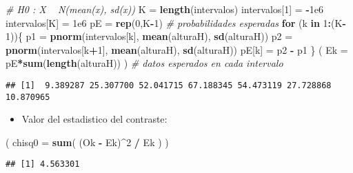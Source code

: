 \documentclass[]{article}
\newenvironment{Shaded}{\begin{snugshade}}{\end{snugshade}}
\newcommand{\KeywordTok}[1]{\textcolor[rgb]{0.13,0.29,0.53}{\textbf{#1}}}
\newcommand{\DataTypeTok}[1]{\textcolor[rgb]{0.13,0.29,0.53}{#1}}
\newcommand{\DecValTok}[1]{\textcolor[rgb]{0.00,0.00,0.81}{#1}}
\newcommand{\FloatTok}[1]{\textcolor[rgb]{0.00,0.00,0.81}{#1}}
\newcommand{\StringTok}[1]{\textcolor[rgb]{0.31,0.60,0.02}{#1}}
\newcommand{\CommentTok}[1]{\textcolor[rgb]{0.56,0.35,0.01}{\textit{#1}}}
\newcommand{\ControlFlowTok}[1]{\textcolor[rgb]{0.13,0.29,0.53}{\textbf{#1}}}
\newcommand{\OperatorTok}[1]{\textcolor[rgb]{0.81,0.36,0.00}{\textbf{#1}}}
\newcommand{\NormalTok}[1]{#1}
\providecommand{\tightlist}{%
  \setlength{\itemsep}{0pt}\setlength{\parskip}{0pt}}
\begin{document}
\begin{Shaded}
\begin{Highlighting}[]
\CommentTok{# H0 : X ~ N(mean(x), sd(x))}
\NormalTok{K =}\StringTok{ }\KeywordTok{length}\NormalTok{(intervalos)}
\NormalTok{intervalos[}\DecValTok{1}\NormalTok{] =}\StringTok{ }\OperatorTok{-}\FloatTok{1e6}
\NormalTok{intervalos[K] =}\StringTok{ }\FloatTok{1e6}
\NormalTok{pE =}\StringTok{ }\KeywordTok{rep}\NormalTok{(}\DecValTok{0}\NormalTok{,K}\OperatorTok{-}\DecValTok{1}\NormalTok{) }\CommentTok{# probabilidades esperadas}
\ControlFlowTok{for}\NormalTok{ (k }\ControlFlowTok{in} \DecValTok{1}\OperatorTok{:}\NormalTok{(K}\OperatorTok{-}\DecValTok{1}\NormalTok{))\{}
\NormalTok{  p1 =}\StringTok{ }\KeywordTok{pnorm}\NormalTok{(intervalos[k], }\KeywordTok{mean}\NormalTok{(alturaH), }\KeywordTok{sd}\NormalTok{(alturaH))}
\NormalTok{  p2 =}\StringTok{ }\KeywordTok{pnorm}\NormalTok{(intervalos[k}\OperatorTok{+}\DecValTok{1}\NormalTok{], }\KeywordTok{mean}\NormalTok{(alturaH), }\KeywordTok{sd}\NormalTok{(alturaH))}
\NormalTok{  pE[k] =}\StringTok{ }\NormalTok{p2 }\OperatorTok{-}\StringTok{ }\NormalTok{p1}
\NormalTok{\}}
\NormalTok{( }\DataTypeTok{Ek =}\NormalTok{ pE}\OperatorTok{*}\KeywordTok{sum}\NormalTok{(}\KeywordTok{length}\NormalTok{(alturaH)) ) }\CommentTok{# datos esperados en cada intervalo}
\end{Highlighting}
\end{Shaded}

\begin{verbatim}
## [1]  9.389287 25.307700 52.041715 67.188345 54.473119 27.728868 10.870965
\end{verbatim}

\begin{itemize}
\tightlist
\item
  Valor del estadistico del contraste:
\end{itemize}

\begin{Shaded}
\begin{Highlighting}[]
\NormalTok{( }\DataTypeTok{chisq0 =} \KeywordTok{sum}\NormalTok{( (Ok }\OperatorTok{-}\StringTok{ }\NormalTok{Ek)}\OperatorTok{^}\DecValTok{2} \OperatorTok{/}\StringTok{ }\NormalTok{Ek ) )}
\end{Highlighting}
\end{Shaded}

\begin{verbatim}
## [1] 4.563301
\end{verbatim}
\end{document}
